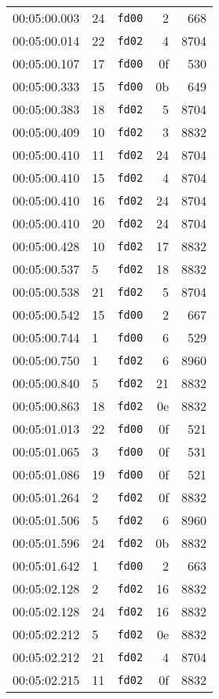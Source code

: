 \documentclass{article}
\begin{document}
\begin{longtable}{lllrr}
00:05:00.003 & 24 & \texttt{fd00} & 2 & 668 \\
00:05:00.014 & 22 & \texttt{fd02} & 4 & 8704 \\
00:05:00.107 & 17 & \texttt{fd00} & 0f & 530 \\
00:05:00.333 & 15 & \texttt{fd00} & 0b & 649 \\
00:05:00.383 & 18 & \texttt{fd02} & 5 & 8704 \\
00:05:00.409 & 10 & \texttt{fd02} & 3 & 8832 \\
00:05:00.410 & 11 & \texttt{fd02} & 24 & 8704 \\
00:05:00.410 & 15 & \texttt{fd02} & 4 & 8704 \\
00:05:00.410 & 16 & \texttt{fd02} & 24 & 8704 \\
00:05:00.410 & 20 & \texttt{fd02} & 24 & 8704 \\
00:05:00.428 & 10 & \texttt{fd02} & 17 & 8832 \\
00:05:00.537 & 5 & \texttt{fd02} & 18 & 8832 \\
00:05:00.538 & 21 & \texttt{fd02} & 5 & 8704 \\
00:05:00.542 & 15 & \texttt{fd00} & 2 & 667 \\
00:05:00.744 & 1 & \texttt{fd00} & 6 & 529 \\
00:05:00.750 & 1 & \texttt{fd02} & 6 & 8960 \\
00:05:00.840 & 5 & \texttt{fd02} & 21 & 8832 \\
00:05:00.863 & 18 & \texttt{fd02} & 0e & 8832 \\
00:05:01.013 & 22 & \texttt{fd00} & 0f & 521 \\
00:05:01.065 & 3 & \texttt{fd00} & 0f & 531 \\
00:05:01.086 & 19 & \texttt{fd00} & 0f & 521 \\
00:05:01.264 & 2 & \texttt{fd02} & 0f & 8832 \\
00:05:01.506 & 5 & \texttt{fd02} & 6 & 8960 \\
00:05:01.596 & 24 & \texttt{fd02} & 0b & 8832 \\
00:05:01.642 & 1 & \texttt{fd00} & 2 & 663 \\
00:05:02.128 & 2 & \texttt{fd02} & 16 & 8832 \\
00:05:02.128 & 24 & \texttt{fd02} & 16 & 8832 \\
00:05:02.212 & 5 & \texttt{fd02} & 0e & 8832 \\
00:05:02.212 & 21 & \texttt{fd02} & 4 & 8704 \\
00:05:02.215 & 11 & \texttt{fd02} & 0f & 8832 \\

\end{longtable}
\end{document}
